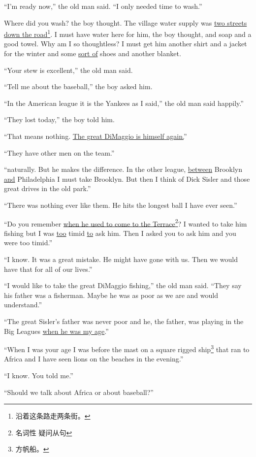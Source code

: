 ``I'm ready now,'' the old man said. ``I only needed time to wash.''

Where did you wash? the boy thought. The village water \gls{supply} was
\uline{two streets down the road}\footnote{沿着这条路走两条街。}. I must have water here for him, the boy
thought, and \gls{soap} and a good \gls{towel}. Why am I so
\gls{thoughtless}? I must get him another shirt and a jacket for the winter
and some \uline{sort of} shoes and another blanket.

``Your stew is excellent,'' the old man said.

``Tell me about the baseball,'' the boy asked him.

``In the American \Gls{league} it is the Yankees as I said,'' the old man said happily.''

``They lost today,'' the boy told him.

``That means nothing. \uline{The great DiMaggio is himself again.}''

``They have other men on the team.''

``\Gls{naturally}. But he makes the difference. In the other league,
\uline{between} Brooklyn \uline{and} Philadelphia I must take Brooklyn. But
then I think of Dick Sisler and those great drives in the old park.''

``There was nothing ever like them. He hits the longest ball I have ever seen.''

``Do you remember \uline{when he used to come to the Terrace}\footnote{名词性
  疑问从句}? I wanted to take him fishing but I was \uline{too} \gls{timid}
\uline{to} ask him. Then I asked you to ask him and you were too timid.''

``I know. It was a great \gls{mistake}. He might have gone with us. Then we
would have that for all of our lives.''

``I would like to take the great DiMaggio fishing,'' the old man said.
``They say his father was a fisherman. Maybe he was as poor as we are and
would understand.''

``The great Sisler's father was never poor and he, the father, was playing
in the Big Leagues \uline{when he was my age}.''

``When I was your age I was before the mast on a \gls{square}
  \gls{rigged} ship\footnote{方帆船。} that ran to Africa and I have seen
lions on the beaches in the evening.''

``I know. You told me.''

``Should we talk about Africa or about baseball?''

